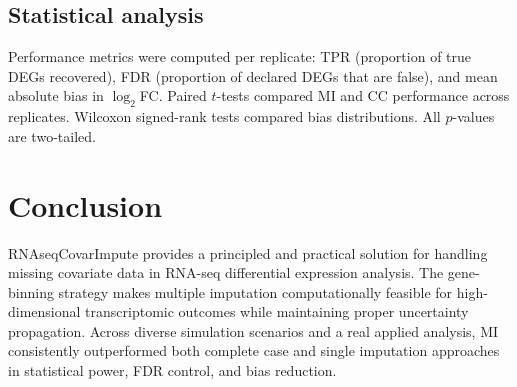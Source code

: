 \documentclass[11pt]{article}
\begin{document}
\subsection{Statistical analysis}

Performance metrics were computed per replicate: TPR (proportion of true DEGs recovered), FDR (proportion of declared DEGs that are false), and mean absolute bias in $\log_2$FC. Paired $t$-tests compared MI and CC performance across replicates. Wilcoxon signed-rank tests compared bias distributions. All $p$-values are two-tailed.

\section{Conclusion}

RNAseqCovarImpute provides a principled and practical solution for handling missing covariate data in RNA-seq differential expression analysis. The gene-binning strategy makes multiple imputation computationally feasible for high-dimensional transcriptomic outcomes while maintaining proper uncertainty propagation. Across diverse simulation scenarios and a real applied analysis, MI consistently outperformed both complete case and single imputation approaches in statistical power, FDR control, and bias reduction.



\end{document}
